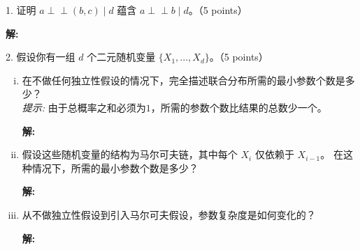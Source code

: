 \documentclass[8pt]{article}
\begin{document}
1. 证明 $a \perp\!\!\!\perp (b, c) \mid d$ 蕴含 $a \perp\!\!\!\perp b \mid d$。（5 points）

\textbf{\large 解:}
\vspace{3em}

2. 假设你有一组 $d$ 个二元随机变量 $\{X_1, ..., X_d\}$。（5 points）
\begin{enumerate}[(i)]
        \item 
        在不做任何独立性假设的情况下，完全描述联合分布所需的最小参数个数是多少？ \\
        \textit{提示:} 由于总概率之和必须为$1$，所需的参数个数比结果的总数少一个。
        
        \textbf{\large 解:}
        \vspace{3em}

        \item 
       假设这些随机变量的结构为马尔可夫链，其中每个 $X_i$ 仅依赖于 $X_{i-1}$。 在这种情况下，所需的最小参数个数是多少？
        
        \textbf{\large 解:}
        \vspace{3em}


        \item 
        从不做独立性假设到引入马尔可夫假设，参数复杂度是如何变化的？
        
        \textbf{\large 解:}
        \vspace{3em}


    \end{enumerate}
    
\vspace{3em}
\end{document}
